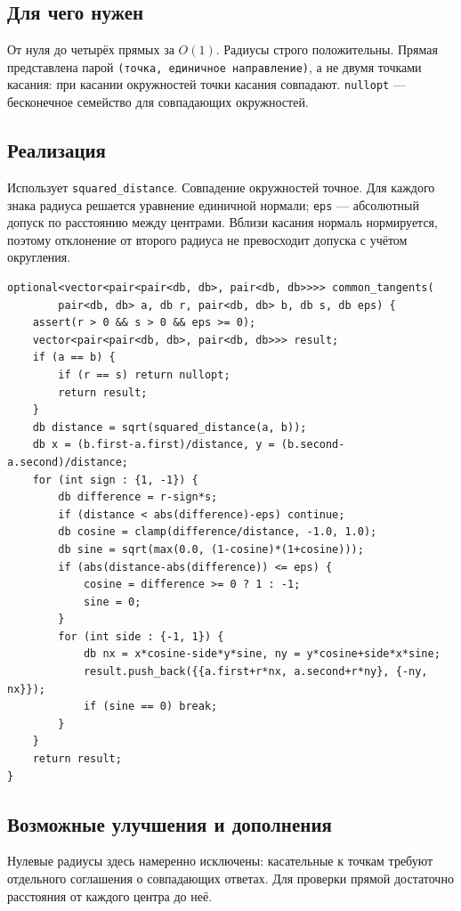 \subsection*{Для чего нужен}
От нуля до четырёх прямых за $O(1)$. Радиусы строго положительны.
Прямая представлена парой \texttt{(точка, единичное направление)}, а не
двумя точками касания: при касании окружностей точки касания совпадают.
\texttt{nullopt} --- бесконечное семейство для совпадающих окружностей.
\subsection*{Реализация}
Использует \texttt{squared\_distance}. Совпадение окружностей точное.
Для каждого знака радиуса решается уравнение единичной нормали;
\texttt{eps} --- абсолютный допуск по расстоянию между центрами.
Вблизи касания нормаль нормируется, поэтому отклонение от второго радиуса
не превосходит допуска с учётом округления.
\begin{lstlisting}[name=geometry_tangents]
optional<vector<pair<pair<db, db>, pair<db, db>>>> common_tangents(
        pair<db, db> a, db r, pair<db, db> b, db s, db eps) {
    assert(r > 0 && s > 0 && eps >= 0);
    vector<pair<pair<db, db>, pair<db, db>>> result;
    if (a == b) {
        if (r == s) return nullopt;
        return result;
    }
    db distance = sqrt(squared_distance(a, b));
    db x = (b.first-a.first)/distance, y = (b.second-a.second)/distance;
    for (int sign : {1, -1}) {
        db difference = r-sign*s;
        if (distance < abs(difference)-eps) continue;
        db cosine = clamp(difference/distance, -1.0, 1.0);
        db sine = sqrt(max(0.0, (1-cosine)*(1+cosine)));
        if (abs(distance-abs(difference)) <= eps) {
            cosine = difference >= 0 ? 1 : -1;
            sine = 0;
        }
        for (int side : {-1, 1}) {
            db nx = x*cosine-side*y*sine, ny = y*cosine+side*x*sine;
            result.push_back({{a.first+r*nx, a.second+r*ny}, {-ny, nx}});
            if (sine == 0) break;
        }
    }
    return result;
}
\end{lstlisting}
\subsection*{Возможные улучшения и дополнения}
Нулевые радиусы здесь намеренно исключены: касательные к точкам требуют
отдельного соглашения о совпадающих ответах. Для проверки прямой достаточно
расстояния от каждого центра до неё.


\fi
\iffalse
